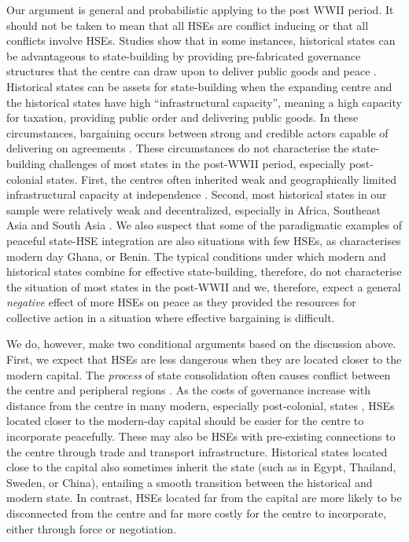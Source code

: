 Our argument is general and probabilistic applying to the post WWII period. It
should not be taken to mean that all HSEs are conflict inducing or that all
conflicts involve HSEs. Studies show that in some instances, historical states
can be advantageous to state-building by providing pre-fabricated governance
structures that the centre can draw upon to deliver public goods and peace
\citep{Ziblatt2008}. Historical states can be assets for state-building when the
expanding centre and the historical states have high ``infrastructural
capacity'', meaning a high capacity for taxation, providing public order and
delivering public goods. In these circumstances, bargaining occurs between
strong and credible actors capable of delivering on agreements
\citep{Ziblatt2008, Wig2016}. These circumstances do not characterise the
state-building challenges of most states in the post-WWII period, especially
post-colonial states. First, the centres often inherited weak and geographically
limited infrastructural capacity at independence \citep{Herbst2014, Migdal1988}.
Second, most historical states in our sample were relatively weak and
decentralized, especially in Africa, Southeast Asia and South Asia
\citep{Herbst2014, Scott2009}. We also suspect that some of the paradigmatic
examples of peaceful state-HSE integration are also situations with few HSEs, as
characterises modern day Ghana, or Benin. The typical conditions under which
modern and historical states combine for effective state-building, therefore, do
not characterise the situation of most states in the post-WWII and we,
therefore, expect a general \textit{negative} effect of more HSEs on peace as
they provided the resources for collective action in a situation where effective
bargaining is difficult. 

We do, however, make two conditional arguments based on the discussion above.
First, we expect that HSEs are less dangerous when they are located closer to
the modern capital. The \textit{process} of state consolidation often causes
conflict between the centre and peripheral regions \citep{Ying2020}. As the
costs of governance increase with distance from the centre in many modern,
especially post-colonial, states \citep{Herbst2014}, HSEs located closer to the
modern-day capital should be easier for the centre to incorporate peacefully.
These may also be HSEs with pre-existing connections to the centre through trade
and transport infrastructure. Historical states located close to the capital
also sometimes inherit the state (such as in Egypt, Thailand, Sweden, or China),
entailing a smooth transition between the historical and modern state. In
contrast, HSEs located far from the capital are more likely to be disconnected
from the centre and far more costly for the centre to incorporate, either
through force or negotiation. 

